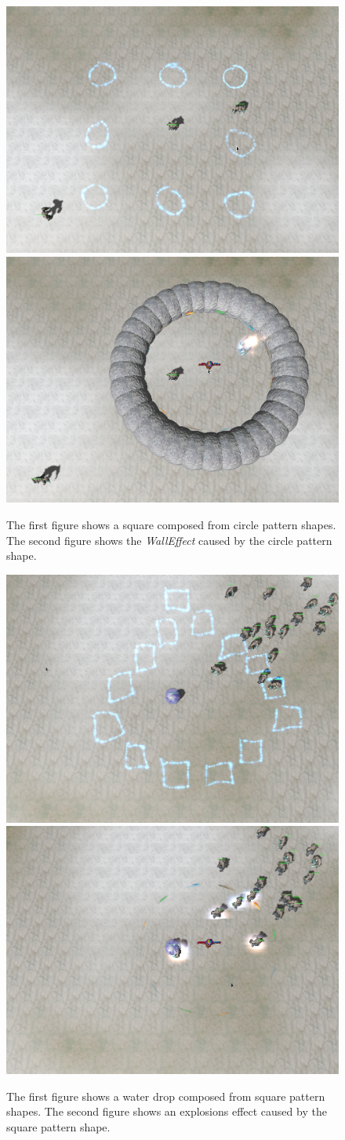 \begin{figure}[p]
\centering
\includegraphics[width=.47\linewidth]{ext/scr/patcircle.png}
\quad
\includegraphics[width=.47\linewidth]{ext/scr/patcirclee.png}
\caption{The first figure shows a square composed from circle pattern shapes. The second figure shows the \emph{WallEffect} caused by the circle pattern shape. }
\label{fig:spell:patcircle}
\end{figure}

\begin{figure}[p]
\centering
\includegraphics[width=.47\linewidth]{ext/scr/patsquare.png}
\quad
\includegraphics[width=.47\linewidth]{ext/scr/patsquaree.png}
\caption{The first figure shows a water drop composed from square pattern shapes. The second figure shows an explosions effect caused by the square pattern shape. }
\label{fig:spell:patsquare}
\end{figure}

